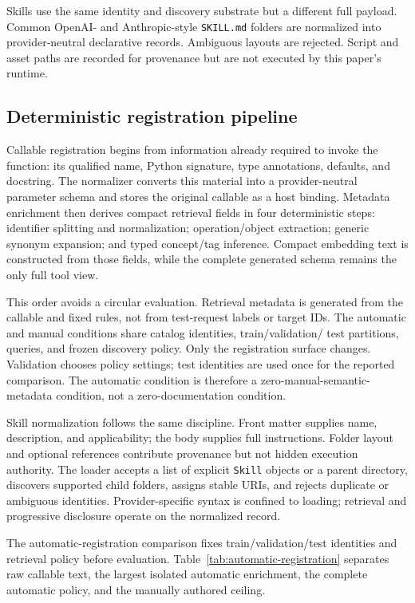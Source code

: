 \documentclass[11pt]{article}
\begin{document}
Skills use the same identity and discovery substrate but a different full
payload. Common OpenAI- and Anthropic-style \texttt{SKILL.md} folders are
normalized into provider-neutral declarative records. Ambiguous layouts are
rejected. Script and asset paths are recorded for provenance but are not
executed by this paper's runtime.

\subsection{Deterministic registration pipeline}

Callable registration begins from information already required to invoke the
function: its qualified name, Python signature, type annotations, defaults,
and docstring. The normalizer converts this material into a provider-neutral
parameter schema and stores the original callable as a host binding. Metadata
enrichment then derives compact retrieval fields in four deterministic steps:
identifier splitting and normalization; operation/object extraction; generic
synonym expansion; and typed concept/tag inference. Compact embedding text is
constructed from those fields, while the complete generated schema remains
the only full tool view.

This order avoids a circular evaluation. Retrieval metadata is generated from
the callable and fixed rules, not from test-request labels or target IDs. The
automatic and manual conditions share catalog identities, train/validation/
test partitions, queries, and frozen discovery policy. Only the registration
surface changes. Validation chooses policy settings; test identities are used
once for the reported comparison. The automatic condition is therefore a
zero-manual-semantic-metadata condition, not a zero-documentation condition.

Skill normalization follows the same discipline. Front matter supplies name,
description, and applicability; the body supplies full instructions. Folder
layout and optional references contribute provenance but not hidden execution
authority. The loader accepts a list of explicit \texttt{Skill} objects or a
parent directory, discovers supported child folders, assigns stable URIs, and
rejects duplicate or ambiguous identities. Provider-specific syntax is
confined to loading; retrieval and progressive disclosure operate on the
normalized record.

The automatic-registration comparison fixes train/validation/test identities
and retrieval policy before evaluation. Table~\ref{tab:automatic-registration}
separates raw callable text, the largest isolated automatic enrichment, the
complete automatic policy, and the manually authored ceiling.
\end{document}
